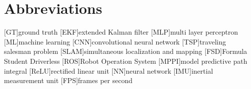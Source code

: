 \chapter{Abbreviations}

\begin{acronym}[AAPC]
	[GT]{ground truth}
	[EKF]{extended Kalman filter}
	[MLP]{multi layer perceptron}
	[ML]{machine learning}
	[CNN]{convolutional neural network}
	[TSP]{traveling salesman problem} 
	[SLAM]{simultaneous localization and mapping}
	[FSD]{Formula Student Driverless}
	[ROS]{Robot Operation System}
	[MPPI]{model predictive path integral}
	[ReLU]{rectified linear unit}
	[NN]{neural network}
	[IMU]{inertial measurement unit}
	[FPS]{frames per second}

\end{acronym}